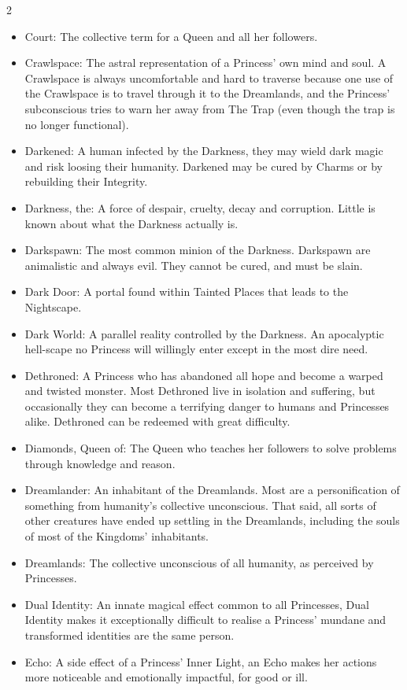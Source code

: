 \begin{multicols}{2}
\begin{itemize}
  \item Court: The collective term for a Queen and all her followers. 
  \item Crawlspace: The astral representation of a Princess' own mind and soul. A Crawlspace is always uncomfortable and hard to traverse because one use of the Crawlspace is to travel through it to the Dreamlands, and the Princess' subconscious tries to warn her away from The Trap (even though the trap is no longer functional). 
  \item Darkened: A human infected by the Darkness, they may wield dark magic and risk loosing their humanity. Darkened may be cured by Charms or by rebuilding their Integrity. 
  \item Darkness, the: A force of despair, cruelty, decay and corruption. Little is known about what the Darkness actually is. 
  \item Darkspawn: The most common minion of the Darkness. Darkspawn are animalistic and always evil. They cannot be cured, and must be slain. 
  \item Dark Door: A portal found within Tainted Places that leads to the Nightscape.
  \item Dark World: A parallel reality controlled by the Darkness. An apocalyptic hell-scape no Princess will willingly enter except in the most dire need. 
  \item Dethroned: A Princess who has abandoned all hope and become a warped and twisted monster. Most Dethroned live in isolation and suffering, but occasionally they can become a terrifying danger to humans and Princesses alike. Dethroned can be redeemed with great difficulty. 
  \item Diamonds, Queen of: The Queen who teaches her followers to solve problems through knowledge and reason.
  \item Dreamlander: An inhabitant of the Dreamlands. Most are a personification of something from humanity's collective unconscious. That said, all sorts of other creatures have ended up settling in the Dreamlands, including the souls of most of the Kingdoms' inhabitants. 
  \item Dreamlands: The collective unconscious of all humanity, as perceived by Princesses. 
  \item Dual Identity: An innate magical effect common to all Princesses, Dual Identity makes it exceptionally difficult to realise a Princess' mundane and transformed identities are the same person. 
  \item Echo: A side effect of a Princess' Inner Light, an Echo makes her actions more noticeable and emotionally impactful, for good or ill. 

\end{itemize}
\end{multicols}
